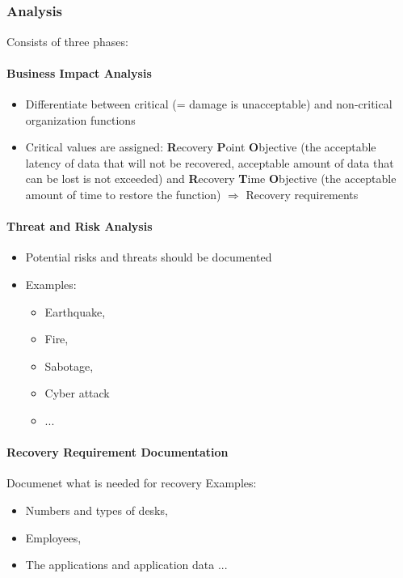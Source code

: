 \documentclass{article}
\begin{document}
\subsection{}
\subsubsection{Analysis}
	Consists of three phases:

	\paragraph{Business Impact Analysis}
	\begin{itemize}
	\item Differentiate between critical (= damage is unacceptable) and non-critical organization functions
	\item Critical values are assigned: \textbf{R}ecovery \textbf{P}oint \textbf{O}bjective (the acceptable latency of data that will not be recovered, acceptable amount of data that can be lost is not exceeded) and \textbf{R}ecovery \textbf{T}ime \textbf{O}bjective (the acceptable amount of time to restore the function)
	$\Rightarrow$ Recovery requirements 
	\end{itemize}

	\paragraph{Threat and Risk Analysis}
	\begin{itemize}
	
		\item Potential risks and threats should be documented
		\item Examples: 
			\begin{itemize}
				\item Earthquake, 
				\item Fire, 
				\item Sabotage, 
				\item Cyber attack
				\item ...
			\end{itemize}
		\end{itemize}

	\paragraph{Recovery Requirement Documentation}
	Documenet what is needed for recovery
	Examples: 
	\begin{itemize}
		\item Numbers and types of desks, 
		\item Employees, 
		\item The applications and application data
		...
	\end{itemize}
\end{document}
